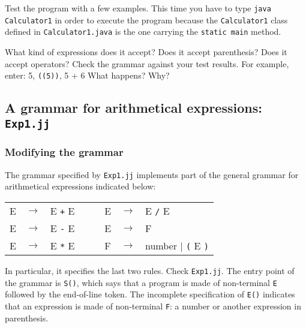 \documentclass{article}
\begin{document}
Test the program with a few examples. This time you have to type {\tt java Calculator1} in order to execute the program because the {\tt Calculator1} class defined in {\tt Calculator1.java} is the one carrying the {\tt static main} method.

What kind of expressions does it accept? Does it accept parenthesis? Does it accept operators? Check the grammar against your test results.
For example, enter: {5}, {\tt((5))}, {5 + 6}
What happens? Why?

\subsection*{A grammar for arithmetical expressions: {\tt Exp1.jj}}

\subsubsection*{Modifying the grammar}

The grammar specified by {\tt Exp1.jj} implements part of the general grammar for arithmetical expressions indicated below:

\begin{tabular}{lclllcl}
E & $\rightarrow$ & E \verb-+- E & $\;\;\;\;$ & E & $\rightarrow$ & E \verb+/+ E \\
E & $\rightarrow$ & E \verb+-+ E & & E & $\rightarrow$ & F\\
E & $\rightarrow$ & E \verb+*+ E & & F & $\rightarrow$ & number $|$ \verb+(+ E \verb+)+\\
\end{tabular}

In particular, it specifies the last two rules. Check {\tt Exp1.jj}. The entry point of the grammar is {\tt S()}, which says that a program is made of non-terminal {\tt E} followed by the end-of-line token. The incomplete specification of {\tt E()} indicates that an expression is made of non-terminal {\tt F}: a number or another expression in parenthesis.
\end{document}
